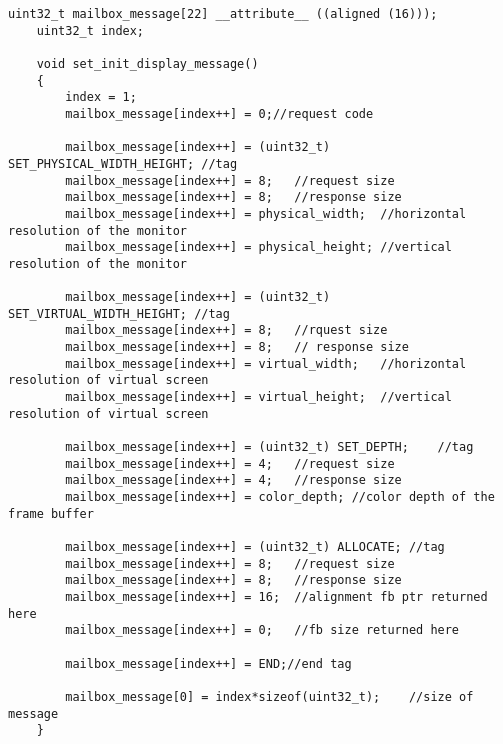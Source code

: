 \documentclass{book}
\begin{document}
	
\begin{lstlisting}[style =C]
	uint32_t mailbox_message[22] __attribute__ ((aligned (16)));
	uint32_t index;
	
	void set_init_display_message()
	{
		index = 1;
		mailbox_message[index++] = 0;//request code
		
		mailbox_message[index++] = (uint32_t) SET_PHYSICAL_WIDTH_HEIGHT; //tag
		mailbox_message[index++] = 8;	//request size
		mailbox_message[index++] = 8;	//response size
		mailbox_message[index++] = physical_width;	//horizontal resolution of the monitor
		mailbox_message[index++] = physical_height;	//vertical resolution of the monitor
		
		mailbox_message[index++] = (uint32_t) SET_VIRTUAL_WIDTH_HEIGHT;	//tag
		mailbox_message[index++] = 8;	//rquest size
		mailbox_message[index++] = 8;	// response size
		mailbox_message[index++] = virtual_width;	//horizontal resolution of virtual screen
		mailbox_message[index++] = virtual_height;	//vertical resolution of virtual screen
		
		mailbox_message[index++] = (uint32_t) SET_DEPTH;	//tag
		mailbox_message[index++] = 4;	//request size
		mailbox_message[index++] = 4;	//response size
		mailbox_message[index++] = color_depth;	//color depth of the frame buffer
		
		mailbox_message[index++] = (uint32_t) ALLOCATE;	//tag
		mailbox_message[index++] = 8;	//request size
		mailbox_message[index++] = 8;	//response size
		mailbox_message[index++] = 16;	//alignment fb ptr returned here
		mailbox_message[index++] = 0;	//fb size returned here
		
		mailbox_message[index++] = END;//end tag
		
		mailbox_message[0] = index*sizeof(uint32_t);	//size of message
	}
\end{lstlisting}
\end{document}
